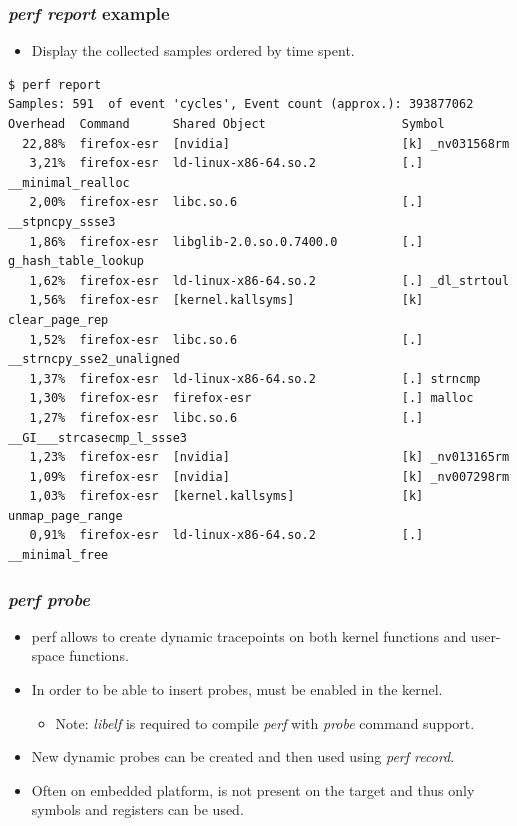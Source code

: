 \begin{frame}[fragile]
  \frametitle{{\em perf report} example}
  \begin{itemize}
    \item Display the collected samples ordered by time spent.
  \end{itemize}
  \begin{block}{}
    \begin{verbatim}
$ perf report
Samples: 591  of event 'cycles', Event count (approx.): 393877062
Overhead  Command      Shared Object                   Symbol
  22,88%  firefox-esr  [nvidia]                        [k] _nv031568rm
   3,21%  firefox-esr  ld-linux-x86-64.so.2            [.] __minimal_realloc
   2,00%  firefox-esr  libc.so.6                       [.] __stpncpy_ssse3
   1,86%  firefox-esr  libglib-2.0.so.0.7400.0         [.] g_hash_table_lookup
   1,62%  firefox-esr  ld-linux-x86-64.so.2            [.] _dl_strtoul
   1,56%  firefox-esr  [kernel.kallsyms]               [k] clear_page_rep
   1,52%  firefox-esr  libc.so.6                       [.] __strncpy_sse2_unaligned
   1,37%  firefox-esr  ld-linux-x86-64.so.2            [.] strncmp
   1,30%  firefox-esr  firefox-esr                     [.] malloc
   1,27%  firefox-esr  libc.so.6                       [.] __GI___strcasecmp_l_ssse3
   1,23%  firefox-esr  [nvidia]                        [k] _nv013165rm
   1,09%  firefox-esr  [nvidia]                        [k] _nv007298rm
   1,03%  firefox-esr  [kernel.kallsyms]               [k] unmap_page_range
   0,91%  firefox-esr  ld-linux-x86-64.so.2            [.] __minimal_free
    \end{verbatim}
  \end{block}
\end{frame}

\begin{frame}
  \frametitle{{\em perf probe}}
  \begin{itemize}
    \item perf allows to create dynamic tracepoints on both kernel functions and
          user-space functions.
    \item In order to be able to insert probes,  must be
          enabled in the kernel.
    \begin{itemize}
      \item Note: {\em libelf} is required to compile {\em perf} with
            {\em probe} command support.
    \end{itemize}
    \item New dynamic probes can be created and then used using
          {\em perf record}.
    \item Often on embedded platform,  is not present on the
          target and thus only symbols and registers can be used.
  \end{itemize}
\end{frame}

